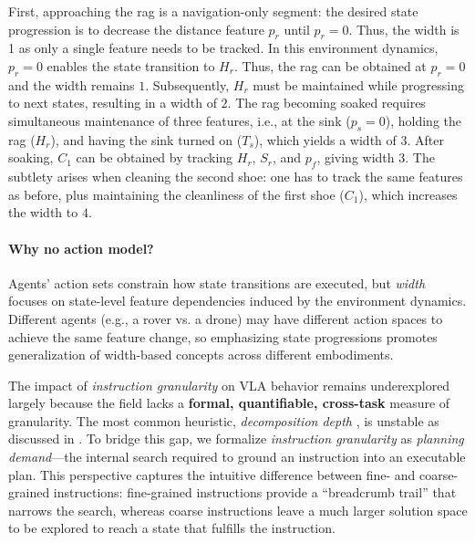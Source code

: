 \documentclass{article}
\begin{document}


First, approaching the rag is a navigation-only segment: the desired state progression is to decrease the distance feature $p_r$ until $p_r=0$. Thus, the width is 1 as only a single feature needs to be tracked. In this environment dynamics, $p_r=0$ enables the state transition to $H_r$. Thus, the rag can be obtained at $p_r=0$ and the width remains $1$. Subsequently, $H_r$ must be maintained while progressing to next states, resulting in a width of $2$. The rag becoming soaked requires simultaneous maintenance of three features, i.e., at the sink ($p_s=0$), holding the rag ($H_r$), and having the sink turned on ($T_s$), which yields a width of $3$. After soaking, $C_1$ can be obtained by tracking $H_r$, $S_r$, and $p_f$, giving width 3. The subtlety arises when cleaning the second shoe: one has to track the same features as before, plus maintaining the cleanliness of the first shoe ($C_1$), which increases the width to $4$. 


\paragraph{Why no action model?}
Agents' action sets constrain how state transitions are executed, but \emph{width} focuses on state-level feature dependencies induced by the environment dynamics. Different agents (e.g., a rover vs. a drone) may have different action spaces to achieve the same feature change, so emphasizing state progressions promotes generalization of width-based concepts across different embodiments.



The impact of \emph{instruction granularity} on VLA behavior remains underexplored largely because the field lacks a \textbf{formal, quantifiable, cross-task} measure of granularity. The most common heuristic, \emph{decomposition depth} \cite{DBLP:conf/corl/MyersZMFL24,DBLP:conf/icml/ShiIEKPVTWWFLDG25}, is unstable as discussed in . To bridge this gap, we formalize \emph{instruction granularity} as \emph{planning demand}---the internal search required to ground an instruction into an executable plan. This perspective captures the intuitive difference between fine- and coarse-grained instructions: fine-grained instructions provide a ``breadcrumb trail''  that narrows the search, whereas coarse instructions leave a much larger solution space to be explored to reach a state that fulfills the instruction.
\end{document}
